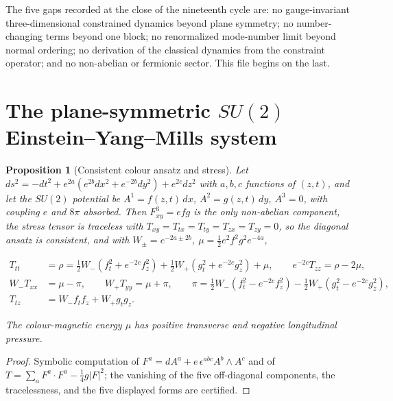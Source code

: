 \documentclass[11pt]{article}
\newtheorem{proposition}[theorem]{Proposition}
\theoremstyle{remark}
\begin{document}
The five gaps recorded at the close of the nineteenth cycle are: no
gauge-invariant three-dimensional constrained dynamics beyond plane
symmetry; no number-changing terms beyond one block; no renormalized
mode-number limit beyond normal ordering; no derivation of the
classical dynamics from the constraint operator; and no non-abelian
or fermionic sector.  This file begins on the last.

\section{The plane-symmetric \texorpdfstring{$SU(2)$}{SU(2)} Einstein--Yang--Mills system}
\label{sec:v20v1-system}

\begin{proposition}[Consistent colour ansatz and stress]
\label{prop:v20v1-ansatz}
Let \(ds^2=-dt^2+e^{2a}(e^{2b}dx^2+e^{-2b}dy^2)+e^{2c}dz^2\) with
\(a,b,c\) functions of \((z,t)\), and let the \(SU(2)\) potential be
\(A^1=f(z,t)\,dx\), \(A^2=g(z,t)\,dy\), \(A^3=0\), with coupling \(e\)
and \(8\pi\) absorbed.  Then \(F^3_{xy}=efg\) is the only non-abelian
component, the stress tensor is traceless with
\(T_{xy}=T_{tx}=T_{ty}=T_{zx}=T_{zy}=0\), so the diagonal ansatz is
consistent, and with \(W_\pm=e^{-2a\pm2b}\),
\(\mu=\tfrac12e^2f^2g^2e^{-4a}\),

\[
\begin{aligned}
 T_{tt}&=\rho=\tfrac12W_-(f_t^2+e^{-2c}f_z^2)+\tfrac12W_+(g_t^2+e^{-2c}g_z^2)+\mu,\qquad
 e^{-2c}T_{zz}=\rho-2\mu,\\
 W_-T_{xx}&=\mu-\pi,\qquad W_+T_{yy}=\mu+\pi,\qquad
 \pi=\tfrac12W_-(f_t^2-e^{-2c}f_z^2)-\tfrac12W_+(g_t^2-e^{-2c}g_z^2),\\
 T_{tz}&=W_-f_tf_z+W_+g_tg_z.
\end{aligned}                                                          \tag{3.1}
\]

The colour-magnetic energy \(\mu\) has positive transverse and negative
longitudinal pressure.
\end{proposition}

\begin{proof}
Symbolic computation of \(F^a=dA^a+e\,\epsilon^{abc}A^b\wedge A^c\) and
of \(T=\sum_aF^a\cdot F^a-\tfrac14g|F|^2\); the vanishing of the five
off-diagonal components, the tracelessness, and the five displayed
forms are certified.
\end{proof}
\end{document}
